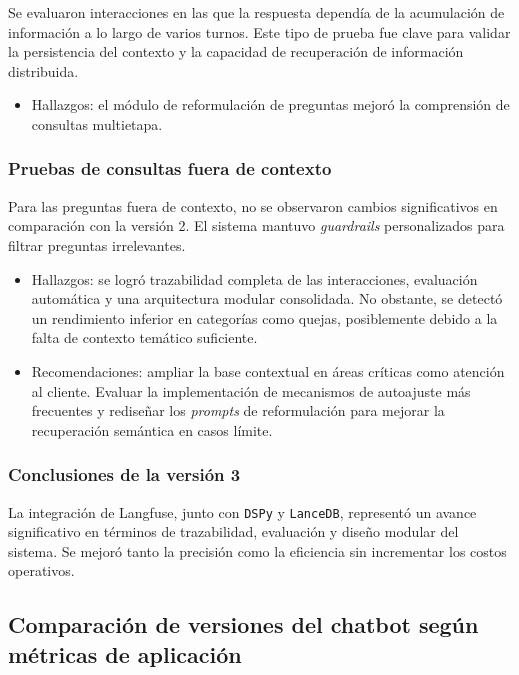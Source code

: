 Se evaluaron interacciones en las que la respuesta dependía de la acumulación de información a lo largo de varios turnos. Este tipo de prueba fue clave para validar la persistencia del contexto y la capacidad de recuperación de información distribuida.

\begin{itemize}
    \item Hallazgos: el módulo de reformulación de preguntas mejoró la comprensión de consultas multietapa.
\end{itemize}

\subsubsection{Pruebas de consultas fuera de contexto}

Para las preguntas fuera de contexto, no se observaron cambios significativos en comparación con la versión 2. El sistema mantuvo \textit{guardrails} personalizados para filtrar preguntas irrelevantes.

\begin{itemize}
    \item Hallazgos: se logró trazabilidad completa de las interacciones, evaluación automática y una arquitectura modular consolidada. No obstante, se detectó un rendimiento inferior en categorías como quejas, posiblemente debido a la falta de contexto temático suficiente.
    \item Recomendaciones: ampliar la base contextual en áreas críticas como atención al cliente. Evaluar la implementación de mecanismos de autoajuste más frecuentes y rediseñar los \textit{prompts} de reformulación para mejorar la recuperación semántica en casos límite.
\end{itemize}

\subsubsection{Conclusiones de la versión 3}

La integración de Langfuse, junto con \texttt{DSPy} y \texttt{LanceDB}, representó un avance significativo en términos de trazabilidad, evaluación y diseño modular del sistema. Se mejoró tanto la precisión como la eficiencia sin incrementar los costos operativos.



\subsection{Comparación de versiones del chatbot según métricas de aplicación}
\label{sec:comparacionVersionesAplicacion}

